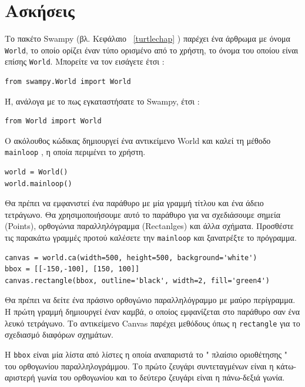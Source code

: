 \documentclass[10pt]{book}
\begin{document}
\section{Ασκήσεις}

\begin{exercise}
\label{canvas} 

Το πακέτο  Swampy  (βλ. Κεφάλαιο~ \ref{turtlechap} ) παρέχει ένα άρθρωμα με όνομα 
 {\tt World},  το οποίο ορίζει έναν τύπο ορισμένο από το χρήστη, το όνομα του οποίου είναι επίσης  {\tt World}.  
Μπορείτε να τον εισάγετε έτσι :

\begin{verbatim}
from swampy.World import World
\end{verbatim}

 Ή, ανάλογα με το πως εγκαταστήσατε το  Swampy,  έτσι :

\begin{verbatim}
from World import World
\end{verbatim}

 Ο ακόλουθος κώδικας δημιουργεί ένα αντικείμενο  World  και καλεί τη μέθοδο  
{\tt mainloop}  , η οποία περιμένει το χρήστη. 

\begin{verbatim}
world = World()
world.mainloop()
\end{verbatim}

 Θα πρέπει να εμφανιστεί ένα παράθυρο με μία γραμμή τίτλου και ένα άδειο τετράγωνο. 
Θα χρησιμοποιήσουμε αυτό το παράθυρο για να σχεδιάσουμε σημεία  (Points),  ορθογώνια 
παραλληλόγραμμα  (Rectanlges)  και άλλα σχήματα. 
Προσθέστε τις παρακάτω γραμμές προτού καλέσετε την  \verb"mainloop"  και ξανατρέξτε το 
πρόγραμμα. 

\begin{verbatim}
canvas = world.ca(width=500, height=500, background='white')
bbox = [[-150,-100], [150, 100]]
canvas.rectangle(bbox, outline='black', width=2, fill='green4')
\end{verbatim}

 Θα πρέπει να δείτε ένα πράσινο ορθογώνιο παραλληλόγραμμο με μαύρο περίγραμμα.  
Η πρώτη γραμμή δημιουργεί έναν καμβά, ο οποίος εμφανίζεται στο παράθυρο σαν ένα λευκό τετράγωνο.  
Το αντικείμενο  Canvas  παρέχει μεθόδους όπως η  {\tt rectangle}  για το σχεδιασμό διαφόρων σχημάτων.  

Η  {\tt bbox}  είναι μία λίστα από λίστες η οποία αναπαριστά το  " πλαίσιο οριοθέτησης "  του 
ορθογωνίου παραλληλογράμμου.  Το πρώτο ζευγάρι συντεταγμένων είναι η κάτω-αριστερή γωνία του ορθογωνίου και το δεύτερο 
ζευγάρι είναι η πάνω-δεξιά γωνία.  


\end{exercise}
\end{document}
